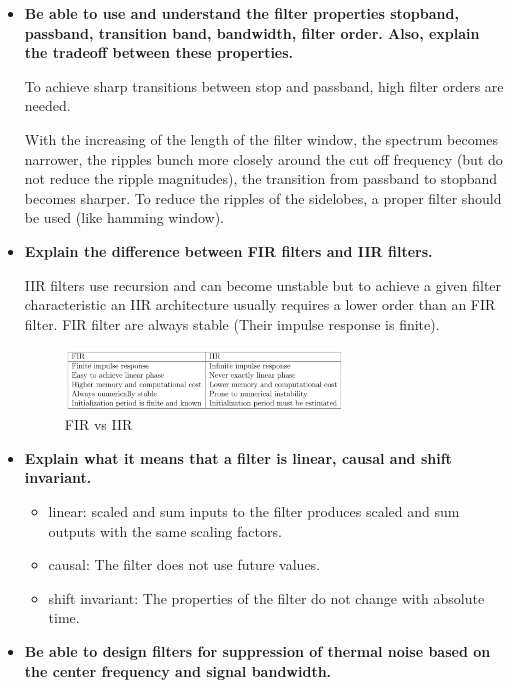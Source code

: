 \documentclass[10pt,a4paper,noendnumber=true]{scrartcl}
\begin{document}
\begin{itemize}
\item \textbf{Be able to use and understand the filter properties stopband, passband, transition band, bandwidth, filter order. Also, explain the tradeoff between these properties.}

To achieve sharp transitions between stop and passband, high filter orders are needed. 

With the increasing of the length of the filter window, the spectrum becomes narrower, the ripples bunch more closely around the cut off frequency (but do not reduce the ripple magnitudes), the transition from passband to stopband becomes sharper. To reduce the ripples of the sidelobes, a proper filter should be used (like hamming window).

\item \textbf{Explain the difference between FIR filters and IIR filters.}

IIR filters use recursion and can become unstable but to achieve a given filter characteristic an IIR architecture usually requires a lower order than an FIR filter. FIR filter are always stable (Their impulse response is finite).

 \begin{figure}[H]
    \centering
\includegraphics[width=0.7\textwidth]{img/FIR_IIR.png}
\renewcommand{\thefootnote}{\fnsymbol{footnote}}
\caption{FIR vs IIR} %
\end{figure}

\item \textbf{Explain what it means that a filter is linear, causal and shift invariant.}

\begin{itemize}
\item linear: scaled and sum inputs to the filter produces scaled and sum outputs with the same scaling factors.
\item causal: The filter does not use future values.
\item shift invariant: The properties of the filter do not change with absolute time.
\end{itemize}

\item \textbf{Be able to design filters for suppression of thermal noise based on the center frequency and signal bandwidth.}
\end{itemize}
\end{document}

